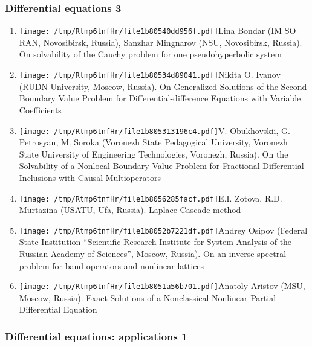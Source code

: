 \documentclass[
]{article}
\providecommand{\tightlist}{%
  \setlength{\itemsep}{0pt}\setlength{\parskip}{0pt}}
\begin{document}
\hypertarget{de3}{%
\subsubsection{Differential equations 3}\label{de3}}

\begin{enumerate}
\def\labelenumi{\arabic{enumi}.}
\tightlist
\item
  \protect\texttt{[image: /tmp/Rtmp6tnfHr/file1b80540dd956f.pdf]}Lina
  Bondar (IM SO RAN, Novosibirsk, Russia), Sanzhar Mingnarov (NSU,
  Novosibirsk, Russia). On solvability of the Cauchy problem for one
  pseudohyperbolic system
\item
  \protect\texttt{[image: /tmp/Rtmp6tnfHr/file1b80534d89041.pdf]}Nikita
  O. Ivanov (RUDN University, Moscow, Russia). On Generalized Solutions
  of the Second Boundary Value Problem for Differential-difference
  Equations with Variable Coefficients
\item
  \protect\texttt{[image: /tmp/Rtmp6tnfHr/file1b805313196c4.pdf]}V.
  Obukhovskii, G. Petrosyan, M. Soroka (Voronezh State Pedagogical
  University, Voronezh State University of Engineering Technologies,
  Voronezh, Russia). On the Solvability of a Nonlocal Boundary Value
  Problem for Fractional Differential Inclusions with Causal
  Multioperators
\item
  \protect\texttt{[image: /tmp/Rtmp6tnfHr/file1b8056285facf.pdf]}E.I.
  Zotova, R.D. Murtazina (USATU, Ufa, Russia). Laplace Cascade method
\item
  \protect\texttt{[image: /tmp/Rtmp6tnfHr/file1b8052b7221df.pdf]}Andrey
  Osipov (Federal State Institution ``Scientific-Research Institute for
  System Analysis of the Russian Academy of Sciences'', Moscow, Russia).
  On an inverse spectral problem for band operators and nonlinear
  lattices
\item
  \protect\texttt{[image: /tmp/Rtmp6tnfHr/file1b8051a56b701.pdf]}Anatoly
  Aristov (MSU, Moscow, Russia). Exact Solutions of a Nonclassical
  Nonlinear Partial Differential Equation
\end{enumerate}

\hypertarget{dea1}{%
\subsubsection{Differential equations: applications 1}\label{dea1}}
\end{document}
